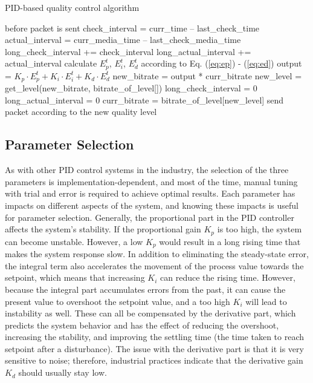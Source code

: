 \documentclass[journal]{IEEEtran}
\begin{document}
\begin{algorithm}
\caption{PID-based quality control algorithm}
\label{algo:control}
\begin{algorithmic}
    \STATE before packet is sent
    \STATE check\_interval = curr\_time -- last\_check\_time
    \STATE actual\_interval = curr\_media\_time -- last\_check\_media\_time
    \STATE long\_check\_interval += check\_interval
    \STATE long\_actual\_interval += actual\_interval
    \STATE calculate $E_p^t$, $E_i^t$, $E_d^t$ according to Eq. (\ref{eq:ep}) - (\ref{eq:ed})
    \STATE output = ${K_p} \cdot E_p^t + {K_i} \cdot E_i^t + {K_d} \cdot E_d^t$
    \STATE new\_bitrate = output * curr\_bitrate
    \STATE new\_level = get\_level(new\_bitrate, bitrate\_of\_level[])
    	\STATE long\_check\_interval = 0
    	\STATE long\_actual\_interval = 0
    	\STATE curr\_bitrate = bitrate\_of\_level[new\_level]
    \ENDIF
    \STATE send packet according to the new quality level
\end{algorithmic}
\end{algorithm}


\subsection{Parameter Selection}
\label{subsec:parameter-selection}

As with other PID control systems in the industry, the selection of the three parameters is implementation-dependent, and most of the time, manual tuning with trial and error is required to achieve optimal results. Each parameter has impacts on different aspects of the system, and knowing these impacts is useful for parameter selection. Generally, the proportional part in the PID controller affects the system's stability. If the proportional gain $K_p$ is too high, the system can become unstable. However, a low $K_p$ would result in a long rising time that makes the system response slow. In addition to eliminating the steady-state error, the integral term also accelerates the movement of the process value towards the setpoint, which means that increasing $K_i$ can reduce the rising time. However, because the integral part accumulates errors from the past, it can cause the present value to overshoot the setpoint value, and a too high $K_i$ will lead to instability as well. These can all be compensated by the derivative part, which predicts the system behavior and has the effect of reducing the overshoot, increasing the stability, and improving the settling time (the time taken to reach setpoint after a disturbance). The issue with the derivative part is that it is very sensitive to noise; therefore, industrial practices indicate that the derivative gain $K_d$ should usually stay low.
\end{document}
